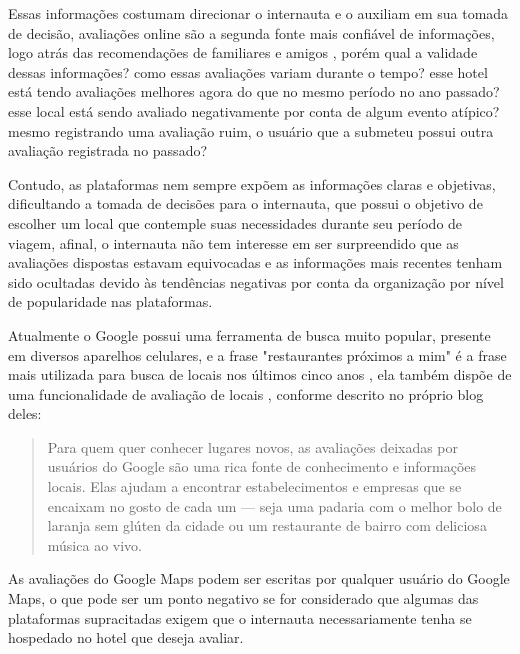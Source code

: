 Essas informações costumam direcionar o internauta e o auxiliam em sua tomada de decisão, avaliações online são a segunda fonte mais confiável de informações, logo atrás das recomendações de familiares e amigos \cite{chatterjee2020drivers}, porém qual a validade dessas informações? como essas avaliações variam durante o tempo? esse hotel está tendo avaliações melhores agora do que no mesmo período no ano passado? esse local está sendo avaliado negativamente por conta de algum evento atípico? mesmo registrando uma avaliação ruim, o usuário que a submeteu possui outra avaliação registrada no passado?

Contudo, as plataformas nem sempre expõem as informações claras e objetivas, dificultando a tomada de decisões para o internauta, que possui o objetivo de escolher um local que contemple suas necessidades durante seu período de viagem, afinal, o internauta não tem interesse em ser surpreendido que as avaliações dispostas estavam equivocadas e as informações mais recentes tenham sido ocultadas devido às tendências negativas por conta da organização por nível de popularidade nas plataformas.

Atualmente o Google possui uma ferramenta de busca muito popular, presente em diversos aparelhos celulares, e a frase "restaurantes próximos a mim" é a frase mais utilizada para busca de locais nos últimos cinco anos \cite{li20213}, ela também dispõe de uma funcionalidade de avaliação de locais \cite[Google Maps]{googleMaps2022Blog}, conforme descrito no próprio blog deles:

\begin{quote}
    Para quem quer conhecer lugares novos, as avaliações deixadas por usuários do Google são uma rica fonte de conhecimento e informações locais. Elas ajudam a encontrar estabelecimentos e empresas que se encaixam no gosto de cada um — seja uma padaria com o melhor bolo de laranja sem glúten da cidade ou um restaurante de bairro com deliciosa música ao vivo.
\end{quote}

As avaliações do Google Maps podem ser escritas por qualquer usuário do Google Maps, o que pode ser um ponto negativo se for considerado que algumas das plataformas supracitadas exigem que o internauta necessariamente tenha se hospedado no hotel que deseja avaliar.

\begin{comment}
O presente relatório está estruturado da seguinte forma: o capítulo~\ref{cap:justificativa} apresenta… o capítulo~\ref{cap:fund_teorica} ... O capítulo~\ref{cap:metodologia} ..., o capítulo~\ref{cap:resultados} ... O capítulo~\ref{cap:conclusao}

Demonstração de citação: o software de análise foi desenvolvido na linguagem Python~\cite{van1995python}, usando as bibliotecas Pandas~\cite{mckinney2010data} e Scikit-learn~\cite{scikit-learn}.
\end{comment}

